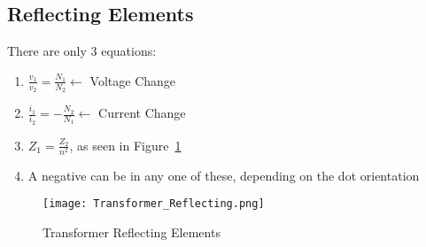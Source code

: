 	\subsection*{Reflecting Elements} \label{subsec:Element Reflection}
		There are only 3 equations:
		\begin{enumerate}
			\item $\frac{v_{1}}{v_{2}} = \frac{N_{1}}{N_{2}} \longleftarrow$ Voltage Change
			\item $\frac{i_{1}}{i_{2}} = -\frac{N_{2}}{N_{1}} \longleftarrow$ Current Change
			\item $Z_{1} = \frac{Z_{2}}{n^{2}}$, as seen in Figure~\ref{fig:Transformer Reflecting}
			\item A negative can be in any one of these, depending on the dot orientation
		\end{enumerate}
		\begin{figure}[ht!]
			\centering
			\texttt{[image: Transformer\_Reflecting.png]}
			\caption{Transformer Reflecting Elements}
			\label{fig:Transformer Reflecting}
		\end{figure}
		\vspace{-10mm}